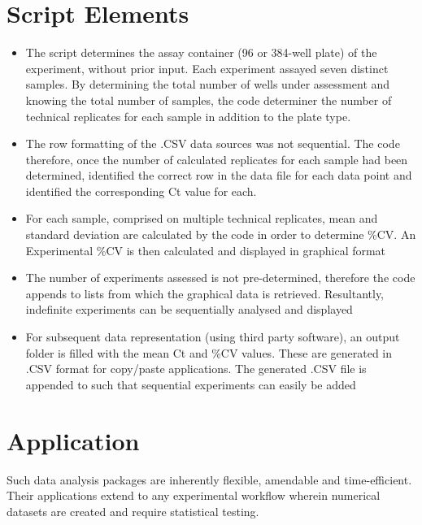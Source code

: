 \documentclass{article}
\newcommand{\Ypoint}{\item[\color{yellow}\textbullet]}
\begin{document}
\section{Script Elements}
\begin{itemize}
\Ypoint{The script determines the assay container (96 or 384-well plate) of the experiment, without prior input.  Each experiment assayed seven distinct samples.  By determining the total number of wells under assessment and knowing the total number of samples, the code determiner the number of technical replicates for each sample in addition to the plate type.}

\Ypoint{The row formatting of the .CSV data sources was not sequential.  The code therefore, once the number of calculated replicates for each sample had been determined, identified the correct row in the data file for each data point and identified the corresponding Ct value for each.}  

\Ypoint{For each sample, comprised on multiple technical replicates, mean and standard deviation are calculated by the code in order to determine \%CV.  An Experimental \%CV is then calculated and displayed in graphical format}

\Ypoint{The number of experiments assessed is not pre-determined, therefore the code appends to lists from which the graphical data is retrieved.  Resultantly, indefinite experiments can be sequentially analysed and displayed}  

\Ypoint{For subsequent data representation (using third party software), an output folder is filled with the mean Ct and \%CV values.  These are generated in .CSV format for copy/paste applications.  The generated .CSV file is appended to such that sequential experiments can easily be added}
\end{itemize}

\section{Application}
Such data analysis packages are inherently flexible, amendable and time-efficient.  Their applications extend to any experimental workflow wherein numerical datasets are created and require statistical testing.  

\end{document}
